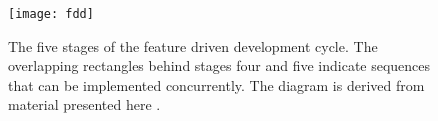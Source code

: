 \begin{figure}[h]
\centering
\texttt{[image: fdd]}
\caption{
    The five stages of the feature driven development cycle. 
    The overlapping rectangles behind stages four and five indicate sequences
    that can be implemented concurrently. 
    The diagram is derived from material presented here \cite[p.~90]{fddjavacol}.
}
\label{fig:fddmodel}
\end{figure}
